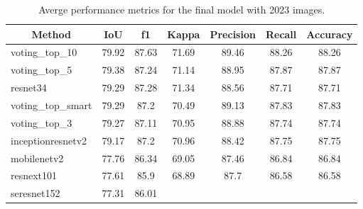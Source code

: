 \begin{table}[H]
    \centering
    \caption{Averge performance metrics for the final model with 2023 images.}
    \label{tab:avg_performance_2023}
    \begin{tabular}{lcccccc}
        \toprule
        \multicolumn{1}{c}{\textbf{Method}} & \textbf{IoU}       &
        \textbf{f1}                         &
        \textbf{Kappa}                      & \textbf{Precision} &
        \textbf{Recall}                     & \textbf{Accuracy}
        \\ \midrule
        voting\_top\_10                     & 79.92              & 87.63
                                            & 71.69              & 89.46 &
        88.26                               & 88.26
        \\
        voting\_top\_5                      & 79.38              & 87.24
                                            & 71.14              & 88.95 &
        87.87                               & 87.87
        \\
        resnet34                            & 79.29              & 87.28
                                            & 71.34              & 88.56 &
        87.71                               & 87.71
        \\
        voting\_top\_smart                  & 79.29              & 87.2
                                            & 70.49              & 89.13 &
        87.83                               & 87.83
        \\
        voting\_top\_3                      & 79.27              & 87.11
                                            & 70.95              & 88.88 &
        87.74                               & 87.74
        \\
        inceptionresnetv2                   & 79.17              & 87.2
                                            & 70.96              & 88.42 &
        87.75                               & 87.75
        \\
        mobilenetv2                         & 77.76              & 86.34
                                            & 69.05              & 87.46 &
        86.84                               & 86.84
        \\
        resnext101                          & 77.61              & 85.9
                                            & 68.89              & 87.7  &
        86.58                               & 86.58
        \\
        seresnet152                         & 77.31              & 86.01

\end{tabular}
\end{table}
